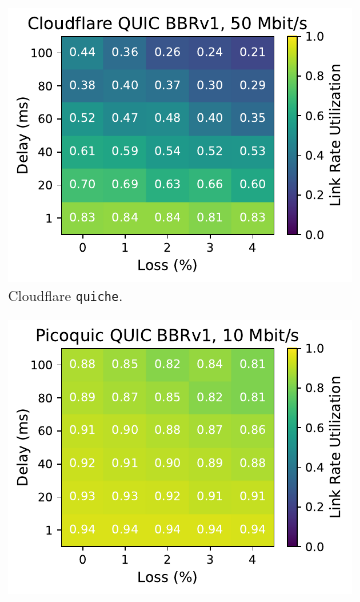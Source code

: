 \begin{figure}[ht]
\begin{subfigure}[b]{0.22\linewidth}
        \includegraphics[width=\linewidth,trim={0 0 2cm 0},clip]{splitting-paper/figures/heatmaps/heatmap_quiche_bbr1_50mbps.pdf}
        \caption{Cloudflare \texttt{quiche}.}
    \end{subfigure}
    \begin{subfigure}[b]{0.22\linewidth}
        \includegraphics[width=\linewidth,trim={0 0 2cm 0},clip]{splitting-paper/figures/heatmaps/heatmap_picoquic_bbr1_10mbps.pdf}

\end{subfigure}
\end{figure}
